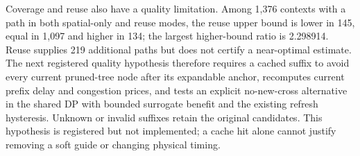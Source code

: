 Coverage and reuse also have a quality limitation. Among 1,376 contexts with a path in both spatial-only and reuse modes, the reuse upper bound is lower in 145, equal in 1,097 and higher in 134; the largest higher-bound ratio is 2.298914. Reuse supplies 219 additional paths but does not certify a near-optimal estimate. The next registered quality hypothesis therefore requires a cached suffix to avoid every current pruned-tree node after its expandable anchor, recomputes current prefix delay and congestion prices, and tests an explicit no-new-cross alternative in the shared DP with bounded surrogate benefit and the existing refresh hysteresis. Unknown or invalid suffixes retain the original candidates. This hypothesis is registered but not implemented; a cache hit alone cannot justify removing a soft guide or changing physical timing.
